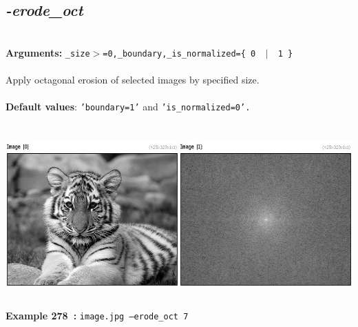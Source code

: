 \documentclass[a4paper,11pt,twoside]{book}
\begin{document}
\subsection{\emph{-erode\_oct} }\vspace*{-0.5em}
~\\\textbf{Arguments: } 
{\small \texttt{\_size$>$=0,\_boundary,\_is\_normalized=\{ 0 ~$|$~ 1 \}}}\\~\\
Apply octagonal erosion of selected images by specified size.
~\\~\\\textbf{Default values}: {\small \texttt{'boundary=1'} and \texttt{'is\_normalized=0'.}}
\begin{center}\includegraphics[keepaspectratio=true,height=7cm,width=\textwidth]{img/gmic_def278.jpg}\\
{\footnotesize \textbf{Example 278~:} \texttt{image.jpg --erode\_oct 7}}
\end{center}
\end{document}

